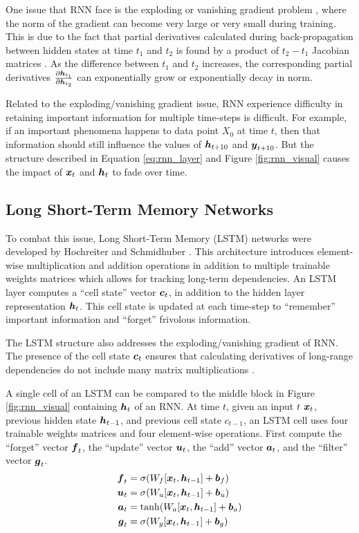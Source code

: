 One issue that RNN face is the exploding or vanishing gradient problem \cite{bengio1994}, where the norm of the gradient can become very large or very small during training. This is due to the fact that partial derivatives calculated during back-propagation between hidden states at time $t_1$ and $t_2$ is found by a product of $t_2 - t_1$ Jacobian matrices \cite{pascanu2013}. As the difference between $t_1$ and $t_2$ increases, the corresponding partial derivatives $\frac{\partial \boldsymbol{h}_{t_1}}{\partial \boldsymbol{h}_{t_2}}$ can exponentially grow or exponentially decay in norm.

Related to the exploding/vanishing gradient issue, RNN experience difficulty in retaining important information for multiple time-steps is difficult. For example, if an important phenomena happens to data point $X_0$ at time $t$, then that information should still influence the values of $\boldsymbol{h}_{t+10}$ and $\boldsymbol{y}_{t+10}$. But the structure described in Equation \ref{eq:rnn_layer} and Figure \ref{fig:rnn_visual} causes the impact of $\boldsymbol{x}_t$ and $\boldsymbol{h}_t$ to fade over time.


\subsection{Long Short-Term Memory Networks}
To combat this issue, Long Short-Term Memory (LSTM) networks were developed by Hochreiter and Schmidhuber \cite{hochreiter1997}. This architecture introduces element-wise multiplication and addition operations in addition to multiple trainable weights matrices which allows for tracking long-term dependencies. An LSTM layer computes a ``cell state'' vector $\boldsymbol{c}_t$, in addition to the hidden layer representation $\boldsymbol{h}_t$. This cell state is updated at each time-step to ``remember'' important information and ``forget'' frivolous information.

The LSTM structure also addresses the exploding/vanishing gradient of RNN. The presence of the cell state $\boldsymbol{c}_t$ ensures that calculating derivatives of long-range dependencies do not include many matrix multiplications \cite{hochreiter1997}.

A single cell of an LSTM can be compared to the middle block in Figure \ref{fig:rnn_visual} containing $\boldsymbol{h}_t$ of an RNN. At time $t$, given an input $t$ $\boldsymbol{x}_t$, previous hidden state $\boldsymbol{h}_{t-1}$, and previous cell state $c_{t-1}$, an LSTM cell uses four trainable weights matrices and four element-wise operations. First compute the ``forget'' vector $\boldsymbol{f}_t$, the ``update'' vector $\boldsymbol{u}_t$, the ``add'' vector $\boldsymbol{a}_t$, and the ``filter'' vector $\boldsymbol{g}_t$.
\begin{equation}
\begin{split}
  \boldsymbol{f}_t &= \sigma(W_f [\boldsymbol{x}_t, \boldsymbol{h}_{t-1}] + \boldsymbol{b}_f) \\
  \boldsymbol{u}_t &= \sigma(W_u [\boldsymbol{x}_t, \boldsymbol{h}_{t-1}] + \boldsymbol{b}_u) \\
  \boldsymbol{a}_t &= \tanh(W_a [\boldsymbol{x}_t, \boldsymbol{h}_{t-1}] + \boldsymbol{b}_a) \\
  \boldsymbol{g}_t &= \sigma(W_g [\boldsymbol{x}_t, \boldsymbol{h}_{t-1}] + \boldsymbol{b}_g)
\end{split}
  \label{eq:lstm_vects}
\end{equation}

